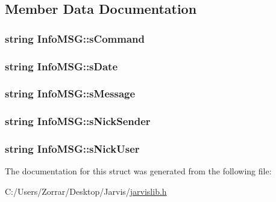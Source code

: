 \subsection{Member Data Documentation}
\hypertarget{struct_info_m_s_g_a3adfa3ded4ee9cb940cb63207c8f189d}{
\subsubsection[{s\-Command}]{\setlength{\rightskip}{0pt plus 5cm}string Info\-M\-S\-G\-::s\-Command}}\label{struct_info_m_s_g_a3adfa3ded4ee9cb940cb63207c8f189d}
\hypertarget{struct_info_m_s_g_a3b29ec965475b758cc2cb22b026eec7c}{
\subsubsection[{s\-Date}]{\setlength{\rightskip}{0pt plus 5cm}string Info\-M\-S\-G\-::s\-Date}}\label{struct_info_m_s_g_a3b29ec965475b758cc2cb22b026eec7c}
\hypertarget{struct_info_m_s_g_a8faf1f1c68cbabd49753b7ef8c3f0a42}{
\subsubsection[{s\-Message}]{\setlength{\rightskip}{0pt plus 5cm}string Info\-M\-S\-G\-::s\-Message}}\label{struct_info_m_s_g_a8faf1f1c68cbabd49753b7ef8c3f0a42}
\hypertarget{struct_info_m_s_g_a1a22a3365033e07b4a8582c44a64ea69}{
\subsubsection[{s\-Nick\-Sender}]{\setlength{\rightskip}{0pt plus 5cm}string Info\-M\-S\-G\-::s\-Nick\-Sender}}\label{struct_info_m_s_g_a1a22a3365033e07b4a8582c44a64ea69}
\hypertarget{struct_info_m_s_g_af69f3f03d86d855c35d191c62bdbc3bc}{
\subsubsection[{s\-Nick\-User}]{\setlength{\rightskip}{0pt plus 5cm}string Info\-M\-S\-G\-::s\-Nick\-User}}\label{struct_info_m_s_g_af69f3f03d86d855c35d191c62bdbc3bc}


The documentation for this struct was generated from the following file\-:\begin{DoxyCompactItemize}
\item 
C\-:/\-Users/\-Zorrar/\-Desktop/\-Jarvis/\hyperlink{jarvislib_8h}{jarvislib.\-h}\end{DoxyCompactItemize}
